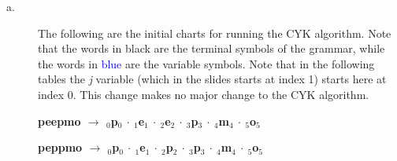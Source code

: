 \documentclass[11pt]{article}
\begin{document}
\newpage

\begin{solution}

\begin{description}

\item[a.]  The following are the initial charts for running the CYK algorithm. Note that the words in black are the terminal symbols of the grammar, while the words in \textcolor{blue}{blue} are the variable symbols.  Note that in the following tables the \textit{j} variable (which in the slides starts at index 1) starts here at index 0.  This change makes no major change to the CYK algorithm.

    \textbf{peepmo $\rightarrow$ $_{0}$p$_{0}$ $\cdot$ $_{1}$e$_{1}$ $\cdot$ $_{2}$e$_{2}$ $\cdot$ $_{3}$p$_{3}$ $\cdot$ $_{4}$m$_{4}$ $\cdot$ $_{5}$o$_{5}$ }


\newpage

    \textbf{peppmo $\rightarrow$ $_{0}$p$_{0}$ $\cdot$ $_{1}$e$_{1}$ $\cdot$ $_{2}$p$_{2}$ $\cdot$ $_{3}$p$_{3}$ $\cdot$ $_{4}$m$_{4}$ $\cdot$ $_{5}$o$_{5}$ }


\end{description}
\end{solution}
\end{document}
